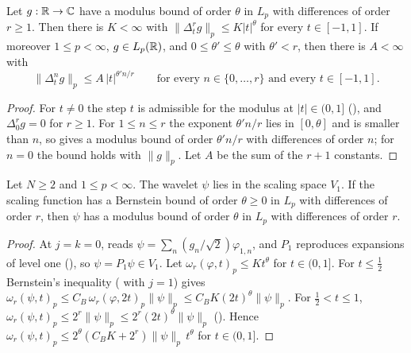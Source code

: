 \begin{lemma}
\label{lem:daub-modulus-bound-steps}
\leanok
{}
Let $g : \mathbb{R} \to \mathbb{C}$ have a modulus bound of order $\theta$ in $L_p$ with differences of order
$r \geq 1$. Then there is $K < \infty$ with $\|\Delta_t^r g\|_p \leq K |t|^\theta$ for every
$t \in [-1, 1]$. If moreover $1 \leq p < \infty$, $g \in L_p(\mathbb{R})$, and
$0 \leq \theta' \leq \theta$ with $\theta' < r$, then there is $A < \infty$ with
\[
  \|\Delta_t^n g\|_p \leq A \, |t|^{\theta' n / r}
  \qquad \text{for every } n \in \{0, \dots, r\} \text{ and every } t \in [-1, 1] .
\]
\end{lemma}

\begin{proof}
\leanok
{}
For $t \neq 0$ the step $t$ is admissible for the modulus at $|t| \in (0, 1]$
(), and $\Delta_0^r g = 0$ for $r \geq 1$. For $1 \leq n \leq r$ the
exponent $\theta' n / r$ lies in $[0, \theta]$ and is smaller than $n$, so
 gives a modulus bound of order $\theta' n / r$ with
differences of order $n$; for $n = 0$ the bound holds with $\|g\|_p$. Let $A$ be the sum of the
$r + 1$ constants.
\end{proof}

\begin{lemma}
\label{lem:daub-wavelet-modulus-bound}
\leanok
{}
Let $N \geq 2$ and $1 \leq p < \infty$. The wavelet $\psi$ lies in the scaling space $V_1$. If
the scaling function has a Bernstein bound of order $\theta \geq 0$ in $L_p$ with differences of
order $r$, then $\psi$ has a modulus bound of order $\theta$ in $L_p$ with differences of
order $r$.
\end{lemma}

\begin{proof}
\leanok
{}
At $j = k = 0$,  reads $\psi = \sum_n (g_n / \sqrt 2) \varphi_{1,n}$,
and $P_1$ reproduces expansions of level one (), so
$\psi = P_1 \psi \in V_1$. Let $\omega_r(\varphi, t)_p \leq K t^\theta$ for $t \in (0, 1]$. For
$t \leq \frac12$ Bernstein's inequality ( with $j = 1$) gives
$\omega_r(\psi, t)_p \leq C_B \, \omega_r(\varphi, 2t)_p \|\psi\|_p
\leq C_B K (2t)^\theta \|\psi\|_p$. For $\frac12 < t \leq 1$,
$\omega_r(\psi, t)_p \leq 2^r \|\psi\|_p \leq 2^r (2t)^\theta \|\psi\|_p$
(). Hence
$\omega_r(\psi, t)_p \leq 2^\theta (C_B K + 2^r) \|\psi\|_p \, t^\theta$ for $t \in (0, 1]$.
\end{proof}

